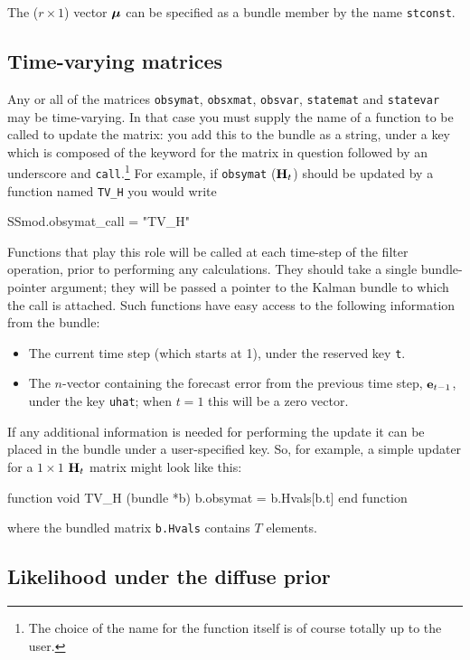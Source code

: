\documentclass[a4paper]{article}
\begin{document}
The ($r \times 1$) vector $\bm{\mu}$ can be specified as a bundle
member by the name \texttt{stconst}.

\subsection{Time-varying matrices}
\label{sec:tvarying}

Any or all of the matrices \texttt{obsymat}, \texttt{obsxmat},
\texttt{obsvar}, \texttt{statemat} and \texttt{statevar} may be
time-varying.  In that case you must supply the name of a function to
be called to update the matrix: you add this to the bundle as a
string, under a key which is composed of the keyword for the matrix in
question followed by an underscore and \texttt{call}.\footnote{The
  choice of the name for the function itself is of course totally up
  to the user.} For example, if \texttt{obsymat} ($\mathbf{H}_t$) should
be updated by a function named \texttt{TV\_H} you would write
%
\begin{code}
SSmod.obsymat_call = "TV_H"
\end{code}
%
Functions that play this role will be called at each time-step of the
filter operation, prior to performing any calculations.  They should
take a single bundle-pointer argument; they will be passed a pointer
to the Kalman bundle to which the call is attached.  Such functions
have easy access to the following information from the bundle:
\begin{itemize}
\item The current time step (which starts at 1), under the
  reserved key \texttt{t}.
\item The $n$-vector containing the forecast error from the
  previous time step, $\mathbf{e}_{t-1}$, under the key \texttt{uhat};
  when $t=1$ this will be a zero vector.
\end{itemize}

If any additional information is needed for performing the update it
can be placed in the bundle under a user-specified key.  So, for
example, a simple updater for a $1 \times 1$ $\mathbf{H}_t$ matrix might
look like this:
%
\begin{code}
function void TV_H (bundle *b)
    b.obsymat = b.Hvals[b.t]
end function
\end{code}
%
where the bundled matrix \texttt{b.Hvals} contains $T$ elements.

\subsection{Likelihood under the diffuse prior}
\label{sec:lldiffuse}
\end{document}

